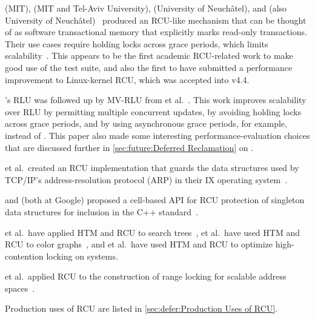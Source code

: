  (MIT),  (MIT and Tel-Aviv University),
 (University of Neuch\^{a}tel), and  (also
University of Neuch\^{a}tel)~\cite{Matveev:2015:RLS:2815400.2815406}
produced an RCU-like mechanism that can be thought of as
software transactional memory that explicitly marks
read-only transactions.
Their use cases require holding locks across grace periods, which limits
scalability~\cite{PaulEMcKenney2015ReadMostly,PaulEMcKenney2015ReadMostlySidebar}.
This appears to be the first academic RCU-related work to
make good use of the  test suite, and also the
first to have submitted a performance improvement to Linux-kernel
RCU, which was accepted into v4.4.

's RLU was followed up by MV-RLU from
 et al.~\cite{Kim:2019:MSR:3297858.3304040}.
This work improves scalability over RLU by permitting multiple concurrent
updates, by avoiding holding locks across grace periods, and by using
asynchronous grace periods, for example,  instead of
.
This paper also made some interesting performance-evaluation choices that
are discussed further in
\cref{sec:future:Deferred Reclamation}
on
.

 et al.~created an RCU implementation that guards the
data structures used by TCP/IP's address-resolution protocol (ARP)
in their IX operating system~\cite{Belay:2016:IOS:3014162.2997641}.

 and  (both at Google) proposed
a cell-based API for RCU
protection of singleton data structures for inclusion in the
C++ standard~\cite{GeoffRomer2018C++DeferredReclamationP0561R4}.

 et al.~have applied
HTM and RCU to search trees~\cite{Siakavaras2017CombiningHA,DimitriosSiakavaras2020RCU-HTM-B+Trees},
 et al.~have used HTM and RCU to color
graphs~\cite{ChristinaGiannoula2018HTM-RCU-graphcoloring},
and
 et al.~have used HTM and RCU to optimize high-contention
locking on  systems.

 et al.~applied RCU to the construction of range locking
for scalable address spaces~\cite{AlexKogan2020RCUrangelocks}.

Production uses of RCU are listed in
\cref{sec:defer:Production Uses of RCU}.

